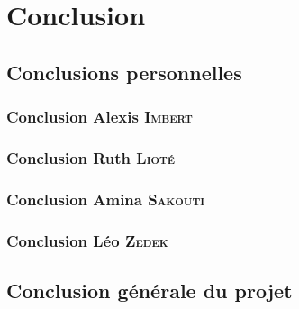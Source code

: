 \section{Conclusion}
	\subsection{Conclusions personnelles}
		\subsubsection{Conclusion Alexis \textsc{Imbert}}
			

		\subsubsection{Conclusion Ruth \textsc{Lioté}}
			

		\subsubsection{Conclusion Amina \textsc{Sakouti}}
			

		\subsubsection{Conclusion Léo \textsc{Zedek}}
			

	\newpage
	\subsection{Conclusion générale du projet}
		
